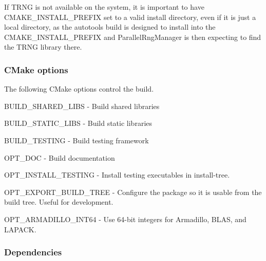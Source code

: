 If T\+R\+NG is not available on the system, it is important to have {\ttfamily C\+M\+A\+K\+E\+\_\+\+I\+N\+S\+T\+A\+L\+L\+\_\+\+P\+R\+E\+F\+IX} set to a valid install directory, even if it is just a local directory, as the autotools build is designed to install into the {\ttfamily C\+M\+A\+K\+E\+\_\+\+I\+N\+S\+T\+A\+L\+L\+\_\+\+P\+R\+E\+F\+IX} and Parallel\+Rng\+Manager is then expecting to find the T\+R\+NG library there.

\subsubsection*{C\+Make options}

The following C\+Make options control the build.
\begin{DoxyItemize}
\item {\ttfamily B\+U\+I\+L\+D\+\_\+\+S\+H\+A\+R\+E\+D\+\_\+\+L\+I\+BS} -\/ Build shared libraries
\item {\ttfamily B\+U\+I\+L\+D\+\_\+\+S\+T\+A\+T\+I\+C\+\_\+\+L\+I\+BS} -\/ Build static libraries
\item {\ttfamily B\+U\+I\+L\+D\+\_\+\+T\+E\+S\+T\+I\+NG} -\/ Build testing framework
\item {\ttfamily O\+P\+T\+\_\+\+D\+OC} -\/ Build documentation
\item {\ttfamily O\+P\+T\+\_\+\+I\+N\+S\+T\+A\+L\+L\+\_\+\+T\+E\+S\+T\+I\+NG} -\/ Install testing executables in install-\/tree.
\item {\ttfamily O\+P\+T\+\_\+\+E\+X\+P\+O\+R\+T\+\_\+\+B\+U\+I\+L\+D\+\_\+\+T\+R\+EE} -\/ Configure the package so it is usable from the build tree. Useful for development.
\item {\ttfamily O\+P\+T\+\_\+\+A\+R\+M\+A\+D\+I\+L\+L\+O\+\_\+\+I\+N\+T64} -\/ Use 64-\/bit integers for Armadillo, B\+L\+AS, and L\+A\+P\+A\+CK.
\end{DoxyItemize}

\subsubsection*{Dependencies}

